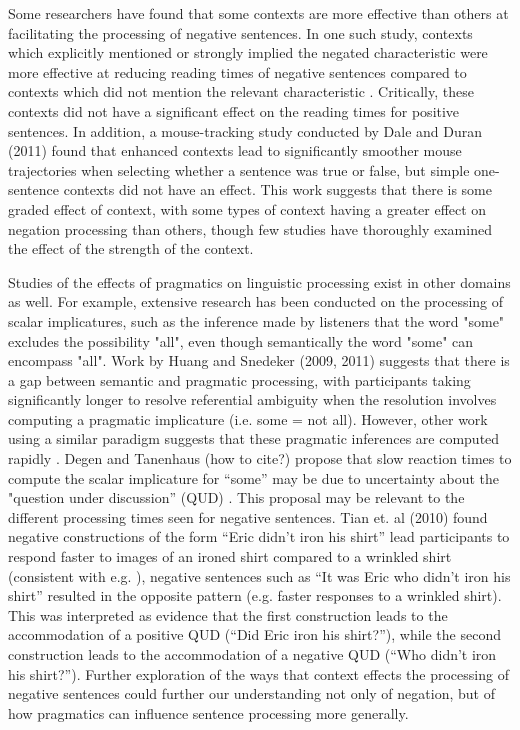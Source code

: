 \documentclass[10pt,letterpaper]{article}
\begin{document}
Some researchers have found that some contexts are more effective than others at facilitating the processing of negative sentences.  In one such study, contexts which explicitly mentioned or strongly implied the negated characteristic were more effective at reducing reading times of negative sentences compared to contexts which did not mention the relevant characteristic \cite{ludtke2006}.  Critically, these contexts did not have a significant effect on the reading times for positive sentences.  In addition, a mouse-tracking study conducted by Dale and Duran (2011) \nocite{dale2011} found that enhanced contexts lead to significantly smoother mouse trajectories when selecting whether a sentence was true or false, but simple one-sentence contexts did not have an effect.  This work suggests that there is some graded effect of context, with some types of context having a greater effect on negation processing than others, though few studies have thoroughly examined the effect of the strength of the context.

Studies of the effects of pragmatics on linguistic processing exist in other domains as well.  For example, extensive research has been conducted on the processing of scalar implicatures, such as the inference made by listeners that the word "some" excludes the possibility "all", even though semantically the word "some" can encompass "all".  Work by Huang and Snedeker (2009, 2011) \nocite{huang2009, huang2011} suggests that there is a gap between semantic and pragmatic processing, with participants taking significantly longer to resolve referential ambiguity when the resolution involves computing a pragmatic implicature (i.e. some = not all).  However, other work using a similar paradigm suggests that these pragmatic inferences are computed rapidly \cite{grodner2010}.  Degen and Tanenhaus (how to cite?) propose that slow reaction times to compute the scalar implicature for ``some'' may be due to uncertainty about the "question under discussion'' (QUD) \cite{roberts1996}.  This proposal may be relevant to the different processing times seen for negative sentences.  Tian et. al (2010) \nocite{tian2010} found negative constructions of the form ``Eric didn't iron his shirt'' lead participants to respond faster to images of an ironed shirt compared to a wrinkled shirt (consistent with e.g. ), negative sentences such as ``It was Eric who didn't iron his shirt'' resulted in the opposite pattern (e.g. faster responses to a wrinkled shirt).  This was interpreted as evidence that the first construction leads to the accommodation of a positive QUD (``Did Eric iron his shirt?''), while the second construction leads to the accommodation of a negative QUD (``Who didn't iron his shirt?'').  Further exploration of the ways that context effects the processing of negative sentences could further our understanding not only of negation, but of how pragmatics can influence sentence processing more generally.  
\end{document}
